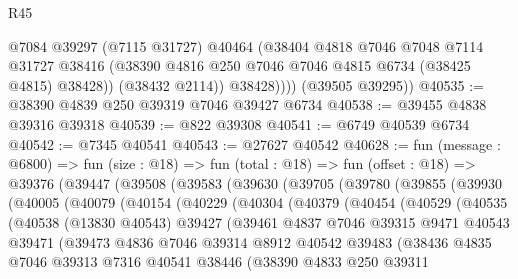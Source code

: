 \begin{lexlean}{R45}
\begin{coremodule}
{                @7084
                @39297
                (@7115 @31727)
                @40464
                (@38404
                  @4818
                  @7046
                  @7048
                  @7114
                  @31727
                  @38416
                  (@38390 @4816 @250 @7046 @7046 @4815 @6734 (@38425 @4815) @38428))
                (@38432 @2114))
              @38428))))
      (@39505 @39295))
@40535 := @38390 @4839 @250 @39319 @7046 @39427 @6734
@40538 := @39455 @4838 @39316 @39318
@40539 := @822 @39308
@40541 := @6749 @40539 @6734
@40542 := @7345 @40541
@40543 := @27627 @40542
@40628 := fun (message : @6800) =>
  fun (size : @18) =>
  fun (total : @18) =>
  fun (offset : @18) =>
  @39376
    (@39447
      (@39508
        (@39583
          (@39630
            (@39705
              (@39780
                (@39855
                  (@39930
                    (@40005
                      (@40079
                        (@40154
                          (@40229
                            (@40304
                              (@40379
                                (@40454
                                  (@40529
                                    (@40535
                                      (@40538
                                        (@13830 @40543)
                                        @39427
                                        (@39461
                                          @4837
                                          @7046
                                          @39315
                                          @9471
                                          @40543
                                          @39471
                                          (@39473
                                            @4836
                                            @7046
                                            @39314
                                            @8912
                                            @40542
                                            @39483
                                            (@38436
                                              @4835
                                              @7046
                                              @39313
                                              @7316
                                              @40541
                                              @38446
                                              (@38390
                                                @4833
                                                @250
                                                @39311
}
\end{coremodule}
\end{lexlean}
